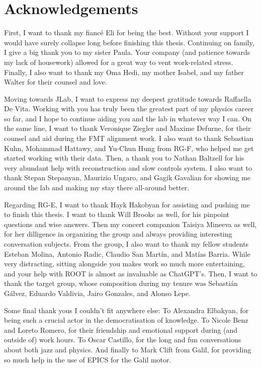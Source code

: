 \section*{Acknowledgements}
    First, I want to thank my fiancé Eli for being the best.
    Without your support I would have surely collapse long before finishing this thesis.
    Continuing on family, I give a big thank you to my sister Paula.
    Your company (and patience towards my lack of housework) allowed for a great way to vent work-related stress.
    Finally, I also want to thank my Oma Hedi, my mother Isabel, and my father Walter for their counsel and love.

    Moving towards JLab, I want to express my deepest gratitude towards Raffaella De Vita.
    Working with you has truly been the greatest part of my physics career so far, and I hope to continue aiding you and the lab in whatever way I can.
    On the same line, I want to thank Veronique Ziegler and Maxime Defurne, for their counsel and aid during the FMT alignment work.
    I also want to thank Sebastian Kuhn, Mohammad Hattawy, and Yu-Chun Hung from RG-F, who helped me get started working with their data.
    Then, a thank you to Nathan Baltzell for his very abundant help with reconstruction and slow controls system.
    I also want to thank Stepan Stepanyan, Maurizio Ungaro, and Gagik Gavalian for showing me around the lab and making my stay there all-around better.

    Regarding RG-E, I want to thank Hayk Hakobyan for assisting and pushing me to finish this thesis.
    I want to thank Will Brooks as well, for his pinpoint questions and wise answers.
    Then my concert companion Taisiya Mineeva as well, for her dilligence in organizing the group and always providing interesting conversation subjects.
    From the group, I also want to thank my fellow students Esteban Molina, Antonio Radic, Claudio San Martín, and Matías Barria.
    While very distracting, sitting alongside you makes work so much more entertaining, and your help with ROOT is almost as invaluable as ChatGPT's.
    Then, I want to thank the target group, whose composition during my tenure was Sebastián Gálvez, Eduardo Valdivia, Jairo Gonzales, and Alonso Lepe.

    Some final thank yous I couldn't fit anywhere else:
    To Alexandra Elbakyan, for being such a crucial actor in the democratisation of knowledge.
    To Nicole Benz and Loreto Romero, for their friendship and emotional support during (and outside of) work hours.
    To Oscar Castillo, for the long and fun conversations about both jazz and physics.
    And finally to Mark Clift from Galil, for providing so much help in the use of EPICS for the Galil motor.
